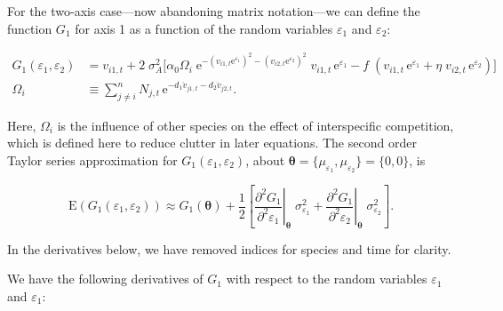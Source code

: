 For the two-axis case---now abandoning matrix notation---we can define the
function $G_1$ for axis 1 as a function 
of the random variables $\varepsilon_{1}$ and $\varepsilon_{2}$:

\begin{equation*}
\begin{split}
    G_1(\varepsilon_{1}, \varepsilon_{2}) &= v_{i1,t} + 2 \; \sigma_A^2
    \Bigg[
        \alpha_0
            \Omega_i \;
            \text{e}^{-(v_{i1,t} \text{e}^{\varepsilon_{1}})^2 - (v_{i2,t} \text{e}^{\varepsilon_{2}})^2} \; v_{i1,t} \, 
            \text{e}^{\varepsilon_{1}}
        - f \; ( v_{i1,t} \, \text{e}^{\varepsilon_{1}} + \eta \; v_{i2,t} \,
            \text{e}^{\varepsilon_{2}} )
    \Bigg] \\
    \Omega_i &\equiv \sum_{j \ne i}^{n}{ N_{j,t} \, \textrm{e}^{
                    - d_1 \ddot{v}_{j1,t} - d_2 \ddot{v}_{j2,t} } }
    \textrm{.}
\end{split}
\end{equation*}

Here, $\Omega_i$ is the influence of other species on the effect of interspecific competition,
which is defined here to reduce clutter in later equations.
The second order Taylor series approximation for $G_1(\varepsilon_{1}, \varepsilon_{2})$,
about $\bm{\theta} = \{ \mu_{\varepsilon_{1}}, \mu_{\varepsilon_{2}} \} = \{ 0, 0 \}$, is

\begin{equation}
\label{eq:taylor-expansion-outline}
    \text{E}(G_1(\varepsilon_{1}, \varepsilon_{2})) \approx G_1(\bm{\theta}) + 
        \frac{1}{2} \left[ 
            \left. \frac{\partial^2 G_1}{\partial^2 \varepsilon_{1}} \right\lvert_{\bm{\theta}} \; \sigma^2_{\varepsilon_{1}} +
            \left. \frac{\partial^2 G_1}{\partial^2 \varepsilon_{2}} \right\lvert_{\bm{\theta}} \; \sigma^2_{\varepsilon_{2}}
        \right]
\text{.}
\end{equation}


In the derivatives below, we have removed indices for species and time for clarity.


We have the following derivatives of $G_1$ with respect to the random variables $\varepsilon_{1}$ and $\varepsilon_{1}$:

